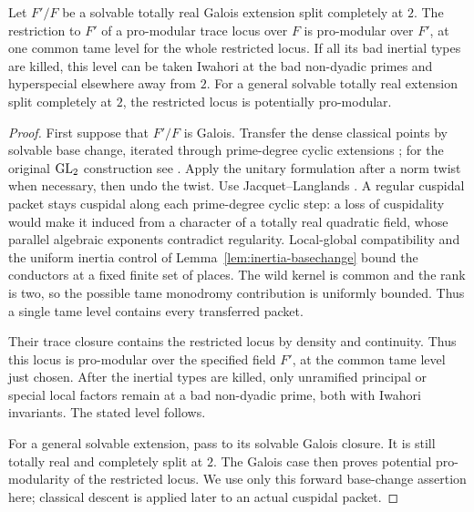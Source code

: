 \begin{lemma}\label{lem:forward-basechange}
Let \(F'/F\) be a solvable totally real Galois extension split
completely at \(2\). The restriction to \(F'\) of a pro-modular
trace locus over \(F\) is pro-modular over \(F'\), at one common
tame level for the whole restricted locus.
If all its bad inertial types are killed, this level
can be taken Iwahori at the bad non-dyadic primes
and hyperspecial elsewhere away from \(2\).
For a general solvable totally real extension split completely
at \(2\), the restricted locus is potentially pro-modular.
\end{lemma}
\begin{proof}
First suppose that \(F'/F\) is Galois. Transfer the dense classical
points by solvable base change, iterated
through prime-degree cyclic extensions
\cite[Chapter~III, Theorems~4.2 and~5.1]{ArthurClozel1989}; for the
original \(\operatorname{GL}_2\) construction see
\cite[Chapter~11, Lemma~11.3 and Proposition~11.4]{Langlands1980}. Apply
the unitary formulation after a norm twist when necessary, then undo
the twist. Use
Jacquet--Langlands \cite[Theorems~14.4 and 16.1]{JacquetLanglands1970}.
A regular
cuspidal packet stays cuspidal along each prime-degree cyclic
step: a loss of cuspidality would make it induced
from a character of a totally real quadratic field,
whose parallel algebraic exponents contradict
regularity. Local-global compatibility and the
uniform inertia control of
Lemma~\ref{lem:inertia-basechange} bound the
conductors at a fixed finite set of places.
The wild kernel is common and the rank is two, so
the possible tame monodromy contribution is
uniformly bounded. Thus a single tame level
contains every transferred packet.

Their trace closure contains the restricted locus
by density and continuity. Thus this locus is pro-modular over
the specified field \(F'\), at the common tame level just chosen.
After the inertial types are killed, only unramified principal or
special local factors remain at a bad
non-dyadic prime, both with Iwahori invariants.
The stated level follows.

For a general solvable extension, pass to its solvable Galois
closure. It is still totally real and completely split at \(2\).
The Galois case then proves potential pro-modularity of the
restricted locus. We use only this forward
base-change assertion here; classical descent
is applied later to an actual cuspidal packet.
\end{proof}
